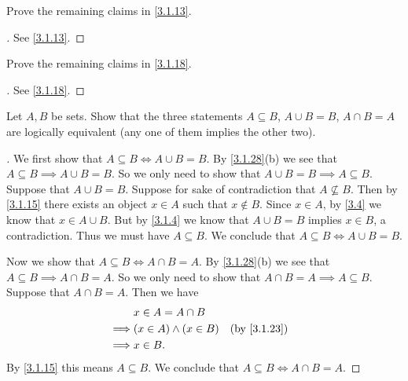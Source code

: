 \begin{ex}\label{ex:3.1.3}
  Prove the remaining claims in \cref{3.1.13}.
\end{ex}

\begin{proof}[]
  See \cref{3.1.13}.
\end{proof}

\begin{ex}\label{ex:3.1.4}
  Prove the remaining claims in \cref{3.1.18}.
\end{ex}

\begin{proof}[]
  See \cref{3.1.18}.
\end{proof}

\begin{ex}\label{ex:3.1.5}
  Let \(A, B\) be sets.
  Show that the three statements \(A \subseteq B\), \(A \cup B = B\), \(A \cap B = A\) are logically equivalent (any one of them implies the other two).
\end{ex}

\begin{proof}[]
  We first show that \(A \subseteq B \iff A \cup B = B\).
  By \cref{3.1.28}(b) we see that \(A \subseteq B \implies A \cup B = B\).
  So we only need to show that \(A \cup B = B \implies A \subseteq B\).
  Suppose that \(A \cup B = B\).
  Suppose for sake of contradiction that \(A \not\subseteq B\).
  Then by \cref{3.1.15} there exists an object \(x \in A\) such that \(x \notin B\).
  Since \(x \in A\), by \cref{3.4} we know that \(x \in A \cup B\).
  But by \cref{3.1.4} we know that \(A \cup B = B\) implies \(x \in B\), a contradiction.
  Thus we must have \(A \subseteq B\).
  We conclude that \(A \subseteq B \iff A \cup B = B\).

  Now we show that \(A \subseteq B \iff A \cap B = A\).
  By \cref{3.1.28}(b) we see that \(A \subseteq B \implies A \cap B = A\).
  So we only need to show that \(A \cap B = A \implies A \subseteq B\).
  Suppose that \(A \cap B = A\).
  Then we have
  \begin{align*}
             & x \in A = A \cap B                         \\
    \implies & (x \in A) \land (x \in B) &  & \by{3.1.23} \\
    \implies & x \in B.
  \end{align*}
  By \cref{3.1.15} this means \(A \subseteq B\).
  We conclude that \(A \subseteq B \iff A \cap B = A\).
\end{proof}

